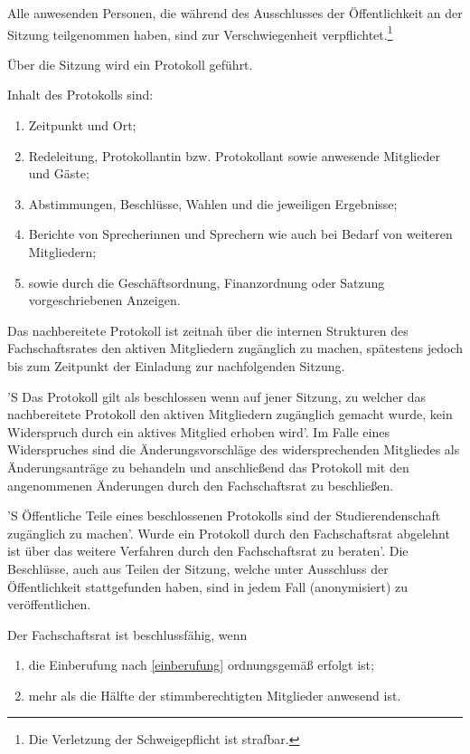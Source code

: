 \documentclass[%
	parskip=half,
]{scrartcl}
\begin{document}
\begin{contract}
Alle anwesenden Personen, die während des Ausschlusses der Öffentlichkeit an der Sitzung teilgenommen haben, sind 
zur Verschwiegenheit verpflichtet.\footnote{Die Verletzung der Schweigepflicht ist strafbar.}


Über die Sitzung wird ein Protokoll geführt.

Inhalt des Protokolls sind:
\begin{enumerate}[\qquad a)]
	\item Zeitpunkt und Ort;
	\item Redeleitung, Protokollantin bzw. Protokollant sowie anwesende Mitglieder und Gäste;
	\item Abstimmungen, Beschlüsse, Wahlen und die jeweiligen Ergebnisse;
	\item Berichte von Sprecherinnen und Sprechern wie auch bei Bedarf von weiteren Mitgliedern;
	\item sowie durch die Geschäftsordnung, Finanzordnung oder Satzung vorgeschriebenen Anzeigen.
\end{enumerate}

Das nachbereitete Protokoll ist zeitnah über die internen Strukturen des Fachschaftsrates den aktiven Mitgliedern
zugänglich zu machen, spätestens jedoch bis zum Zeitpunkt der Einladung zur nachfolgenden Sitzung.

'S Das Protokoll gilt als beschlossen wenn auf jener Sitzung, zu welcher das nachbereitete Protokoll den aktiven
Mitgliedern zugänglich gemacht wurde, kein Widerspruch durch ein aktives Mitglied erhoben wird'. Im Falle eines
Widerspruches sind die Änderungsvorschläge des widersprechenden Mitgliedes als Änderungsanträge zu behandeln und
anschließend das Protokoll mit den angenommenen Änderungen durch den Fachschaftsrat zu beschließen.

'S Öffentliche Teile eines beschlossenen Protokolls sind der Studierendenschaft zugänglich zu machen'. Wurde ein
Protokoll durch den Fachschaftsrat abgelehnt ist über das weitere Verfahren durch den Fachschaftsrat zu beraten'. Die
Beschlüsse, auch aus Teilen der Sitzung, welche unter Ausschluss der Öffentlichkeit stattgefunden haben, sind in jedem
Fall (anonymisiert) zu veröffentlichen.


Der Fachschaftsrat ist beschlussfähig, wenn
\begin{enumerate}[\qquad a)]
	\item die Einberufung nach \ref{einberufung} ordnungsgemäß erfolgt ist;
	\item mehr als die Hälfte der stimmberechtigten Mitglieder anwesend ist.
\end{enumerate}


\end{contract}
\end{document}
